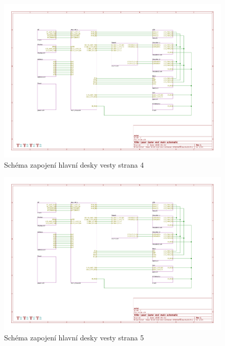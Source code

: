 \begin{landscape}
    \begin{figure}[h]
        \centering
        \includegraphics[page=4, height=\textwidth]{sch/main}
        \caption{Schéma zapojení hlavní desky vesty strana 4}
    \end{figure}
\end{landscape}
\begin{landscape}
    \begin{figure}[h]
        \centering
        \includegraphics[page=5, height=\textwidth]{sch/main}
        \caption{Schéma zapojení hlavní desky vesty strana 5}
    \end{figure}
\end{landscape}
